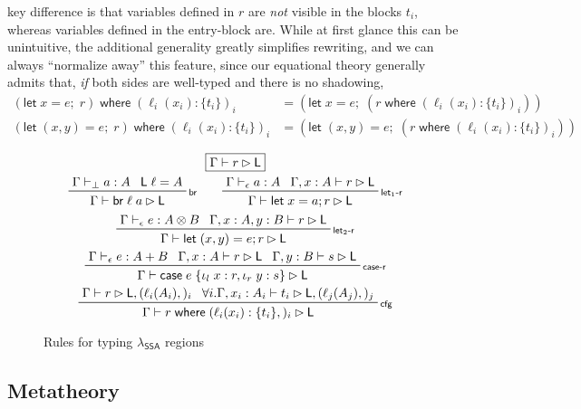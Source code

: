 \documentclass[acmsmall,screen,review]{acmart}
\newcommand{\ms}[1]{\ensuremath{\mathsf{#1}}}
\newcommand{\lto}{:}
\newcommand{\linl}[1]{\iota_l\;{#1}}
\newcommand{\linr}[1]{\iota_r\;{#1}}
\newcommand{\letexpr}[3]{\ensuremath{\ms{let}\;#1 = #2;\;#3}}
\newcommand{\letstmt}[3]{\ensuremath{\ms{let}\;#1 = #2; #3}}
\newcommand{\brb}[2]{\ms{br}\;#1\;#2}
\newcommand{\casestmt}[5]{\ms{case}\;#1\;\{\linl{#2} \lto #3, \linr{#4} \lto #5\}}
\newcommand{\where}[2]{#1\;\ms{where}\;#2}
\newcommand{\wbranch}[3]{#1(#2) \lto \{#3\}}
\newcommand{\bhyp}[2]{#1 : #2}
\newcommand{\lhyp}[2]{#1(#2)}
\newcommand{\rle}[1]{{\scriptsize\textsf{#1}}}
\newcommand{\hasty}[4]{#1 \vdash_{#2} #3: {#4}}
\newcommand{\haslb}[3]{#1 \vdash #2 \rhd #3}
\newcommand{\isotopessa}{\(\lambda_{\ms{SSA}}\)}
\begin{document}
key difference is that variables defined in $r$ are \emph{not} visible in the blocks $t_i$, whereas
variables defined in the entry-block are. While at first glance this can be unintuitive, the
additional generality greatly simplifies rewriting, and we can always ``normalize away'' this
feature, since our equational theory generally admits that, \emph{if} both sides are well-typed and
there is no shadowing,
\begin{align*}
  \where{(\letexpr{x}{e}{r})}{(\wbranch{\ell_i}{x_i}{t_i})_i}
  &= (\letexpr{x}{e}{(\where{r}{(\wbranch{\ell_i}{x_i}{t_i})_i})}) \\
  \where{(\letexpr{(x, y)}{e}{r})}{(\wbranch{\ell_i}{x_i}{t_i})_i}
  &= (\letexpr{(x, y)}{e}{(\where{r}{(\wbranch{\ell_i}{x_i}{t_i})_i})})
\end{align*}

\begin{figure}
  \begin{gather*}
    \boxed{\haslb{\Gamma}{r}{\ms{L}}} \\
    \prftree[r]{\rle{br}}{\hasty{\Gamma}{\bot}{a}{A}}{\ms{L}\;\ell = A}
      {\haslb{\Gamma}{\brb{\ell}{a}}{\ms{L}}} \qquad
    \prftree[r]{\rle{let$_1$-r}}
      {\hasty{\Gamma}{\epsilon}{a}{A}}
      {\haslb{\Gamma, \bhyp{x}{A}}{r}{\ms{L}}}
      {\haslb{\Gamma}{\letstmt{x}{a}{r}}{\ms{L}}} \\
    \prftree[r]{\rle{let$_2$-r}}
      {\hasty{\Gamma}{\epsilon}{e}{A \otimes B}}
      {\haslb{\Gamma, \bhyp{x}{A}, \bhyp{y}{B}}{r}{\ms{L}}}
      {\haslb{\Gamma}{\letstmt{(x, y)}{e}{r}}{\ms{L}}} \\
    \prftree[r]{\rle{case-r}}
      {\hasty{\Gamma}{\epsilon}{e}{A + B}}
      {\haslb{\Gamma, \bhyp{x}{A}}{r}{\ms{L}}}
      {\haslb{\Gamma, \bhyp{y}{B}}{s}{\ms{L}}}
      {\haslb{\Gamma}{\casestmt{e}{x}{r}{y}{s}}{\ms{L}}} \\
    \prftree[r]{\rle{cfg}}
      {\haslb{\Gamma}{r}{\ms{L}, (\lhyp{\ell_i}{A_i},)_i}}
      {\forall i. \haslb{\Gamma, \bhyp{x_i}{A_i}}{t_i}{\ms{L}, (\lhyp{\ell_j}{A_j},)_j}}
      {\haslb{\Gamma}{\where{r}{(\wbranch{\ell_i}{x_i}{t_i},)_i}}{\ms{L}}}
  \end{gather*}
  \caption{Rules for typing \isotopessa{} regions}
  \Description{}
  \label{fig:ssa-reg-rules}
\end{figure}

\subsection{Metatheory}
\end{document}
